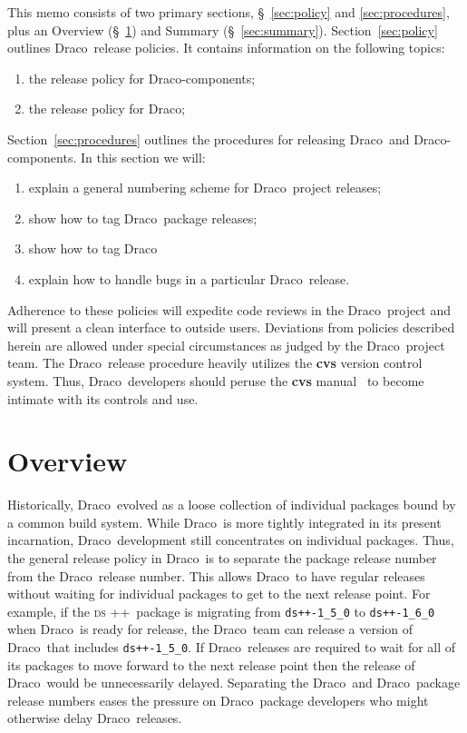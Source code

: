 \documentclass[11pt]{nmemo}
\newcommand{\draco}{{\normalfont\normalsize\textsf Draco}}
\newcommand{\dsxx}{{\normalfont\normalsize\scshape ds\raisebox{.2ex}
  {\scriptsize ++}}}
\begin{document}
This memo consists of two primary sections, \S~\ref{sec:policy} and
\ref{sec:procedures}, plus an Overview (\S~\ref{sec:overview}) and
Summary (\S~\ref{sec:summary}).  Section~\ref{sec:policy} outlines
\draco\ release policies.  It contains information on the following
topics:
\begin{enumerate}
\item the release policy for \draco-components;
\item the release policy for \draco;
\end{enumerate}
Section~\ref{sec:procedures} outlines the procedures for releasing
\draco\ and \draco-components.  In this section we will:
\begin{enumerate}
\item explain a general numbering scheme for \draco\ project releases;
\item show how to tag \draco\ package releases;
\item show how to tag \draco\;
\item explain how to handle bugs in a particular \draco\ release.
\end{enumerate}
Adherence to these policies will expedite code reviews in the \draco\ 
project and will present a clean interface to outside users.
Deviations from policies described herein are allowed under special
circumstances as judged by the \draco\ project team.  The \draco\ 
release procedure heavily utilizes the {\bf cvs} version control
system.  Thus, \draco\ developers should peruse the {\bf cvs}
manual~\cite{cvs} to become intimate with its controls and use.


\section{Overview}
\label{sec:overview}

Historically, \draco\ evolved as a loose collection of individual
packages bound by a common build system.  While \draco\ is more
tightly integrated in its present incarnation, \draco\ development
still concentrates on individual packages.  Thus, the general release
policy in \draco\ is to separate the package release number from the
\draco\ release number.  This allows \draco\ to have regular releases
without waiting for individual packages to get to the next release
point.  For example, if the \dsxx\ package is migrating from
\texttt{ds++-1\_5\_0} to \texttt{ds++-1\_6\_0} when \draco\ is ready
for release, the \draco\ team can release a version of \draco\ that
includes \texttt{ds++-1\_5\_0}.  If \draco\ releases are required to
wait for all of its packages to move forward to the next release point
then the release of \draco\ would be unnecessarily delayed.
Separating the \draco\ and \draco\ package release numbers eases the
pressure on \draco\ package developers who might otherwise delay
\draco\ releases.
\end{document}
